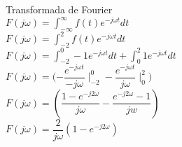 \documentclass[10pt,a4paper]{article}
\begin{document}
\begin{center}
Transformada de Fourier\\
$\displaystyle{F(j \omega) = \int_{-\infty}^{\infty} f(t) e^{-j \omega t} dt}$\\
$\displaystyle{F(j \omega) = \int_{-2}^{2} f(t) e^{-j \omega t} dt}$\\
$\displaystyle{F(j \omega) = \int_{-2}^{0} -1 e^{-j \omega t} dt + \int_{0}^{2}1 e^{-j \omega t} dt}$\\
$\displaystyle{F(j \omega) =(-\dfrac{ e^{-j \omega t}}{-j \omega}  \mid_{-2}^ {0} - \dfrac{ e^{-j \omega t}}{j \omega} \mid_{0}^{2}})$\\
$\displaystyle{F(j \omega) =(\dfrac{1-e^{-j2 \omega }}{j \omega} - \dfrac{e^{-j2 \omega}- 1}{jw})}$\\
$\displaystyle{F(j \omega) =  \dfrac{2}{j \omega}(1- e^{-j2 \omega })}$\\
\end{center}
\end{document}
